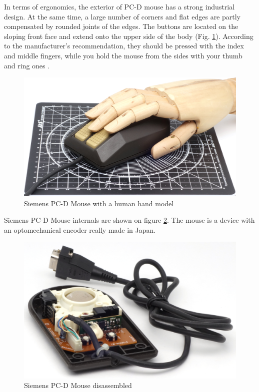 \documentclass[11pt, a4paper]{article}
\begin{document}
In terms of ergonomics, the exterior of PC-D mouse has a strong industrial design. At the same time, a large number of corners and flat edges are partly compensated by rounded joints of the edges. The buttons are located on the sloping front face and extend onto the upper side of the body (Fig. \ref{fig:SiemensPCDHand}). According to the manufacturer's recommendation, they should be pressed with the index and middle fingers, while you hold the mouse from the sides with your thumb and ring ones \cite{manual}.

\begin{figure}[h]
    \centering
    \includegraphics[scale=0.45]{1985_siemens_pcd_mouse/hand_30.jpg}
    \caption{Siemens PC-D Mouse with a human hand model}
    \label{fig:SiemensPCDHand}
\end{figure}

Siemens PC-D Mouse internals are shown on figure \ref{fig:SiemensPCDInside}. The mouse is a device with an optomechanical encoder really made in Japan.

\begin{figure}[h]
    \centering
    \includegraphics[scale=0.8]{1985_siemens_pcd_mouse/inside_30.jpg}
    \caption{Siemens PC-D Mouse disassembled}
    \label{fig:SiemensPCDInside}
\end{figure}
\end{document}
